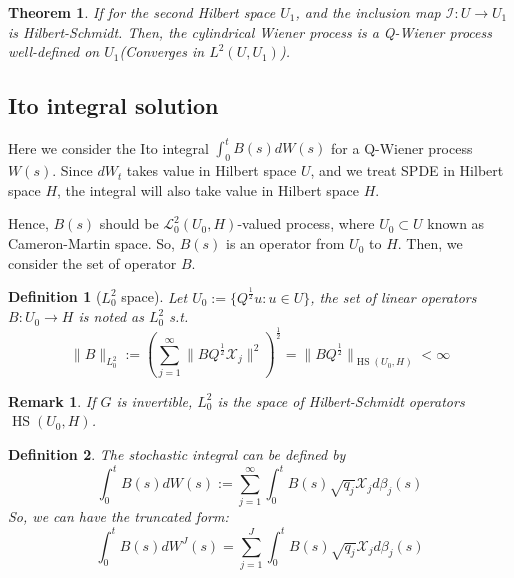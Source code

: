 \documentclass{article}
\newtheorem{theorem}{Theorem}
\newtheorem{remark}{Remark}
\newtheorem{definition}{Definition}
\begin{document}
\begin{theorem}
    If for the second Hilbert space $U_1$, and the inclusion map $\mathcal{I}: U \rightarrow U_1$ is Hilbert-Schmidt. 
    Then, the cylindrical Wiener process is a Q-Wiener process well-defined on $U_1$(Converges in $L^2(U, U_1)$).
\end{theorem}

\subsection{Ito integral solution}
Here we consider the Ito integral $\int_0^t B(s)dW(s)$ for a Q-Wiener process $W(s)$. 
Since $dW_t$ takes value in Hilbert space $U$, and we treat SPDE in Hilbert space $H$, the integral will also take value in Hilbert space $H$.

Hence, $B(s)$ should be $\mathcal{L}_0^2(U_0, H)$-valued process, where $U_0\subset U$ known as Cameron-Martin space. 
So, $B(s)$ is an operator from $U_0$ to $H$. Then, we consider the set of operator $B$.
\begin{definition}[$L_0^2$ space]
    Let $U_0:=\{Q^{\frac{1}{2}}u: u\in U\}$, the set of linear operators $B:U_0\rightarrow H$ is noted as $L_0^2$ s.t. 
    \begin{equation}
        \|B\|_{L_0^2} := \left(\sum_{j=1}^\infty \|BQ^{\frac{1}{2}}\mathcal{X}_j\|^2\right)^{\frac{1}{2}} = \|BQ^{\frac{1}{2}}\|_{\operatorname{HS}(U_0, H)}<\infty
    \end{equation}
\end{definition}
\begin{remark}
    If $G$ is invertible, $L_0^2$ is the space of Hilbert-Schmidt operators $\operatorname{HS}(U_0, H)$.
\end{remark}

\begin{definition}
    The stochastic integral can be defined by
    \begin{equation}
    \int_0^t B(s)dW(s) := \sum_{j=1}^\infty \int_0^t B(s)\sqrt{q_j}\mathcal{X}_j d\beta_j(s)
\end{equation}
So, we can have the truncated form:
\begin{equation}
    \int_0^t B(s)dW^J(s) = \sum_{j=1}^J \int_0^t B(s)\sqrt{q_j}\mathcal{X}_j d\beta_j(s)
\end{equation}
\end{definition}
\end{document}
